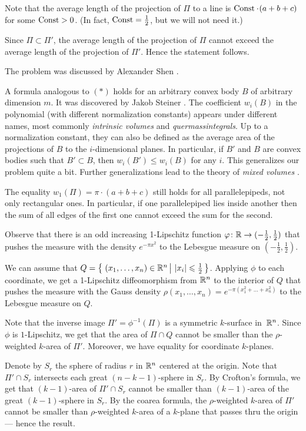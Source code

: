Note that the average length of the projection of $\Pi$ to a line is
$\Const\cdot(a+b+c)$ for some $\operatorname{\rm Const}\nolimits>0$.
(In fact, $\operatorname{\rm Const}\nolimits=\tfrac12$, but we will not need it.)

Since $\Pi\subset \Pi'$,
the average length of the projection of $\Pi$
cannot exceed the average length of the projection of $\Pi'$.
Hence the statement follows.
\qeds

The problem was discussed by Alexander Shen \cite{shen}.

A formula analogous to $({*})$
holds for an arbitrary convex body $B$ of arbitrary dimension $m$.
It was discovered by Jakob Steiner \cite{steiner}.
The coefficient $w_i(B)$ in the polynomial (with different normalization constants)
appears under different names, most commonly
\emph{intrinsic volumes} and
\emph{quermassintegrals}.
Up to a normalization constant,
they can also be defined as the average 
area of the projections of $B$ to the $i$-dimensional planes.
In particular, 
if $B'$ and $B$ are convex bodies such that $B'\subset B$,
then $w_i(B')\le w_i(B)$ for any $i$.
This generalizes our problem quite a bit.
Further generalizations lead to the theory of \emph{mixed volumes} \cite{burago-zalgaller}.

The equality $w_1(\Pi)=\pi\cdot (a+b+c)$ still holds for all parallelepipeds, not only rectangular ones.
In particular, if one parallelepiped 
lies inside another then the sum of all edges of the first one cannot exceed the sum for the second.

Observe that there is an odd increasing 1-Lipschitz function $\varphi\colon\mathbb{R}\to(-\tfrac12,\tfrac12)$ that pushes the measure with the density $e^{-\pi x^2}$ to the Lebesgue measure on $(-\tfrac12,\tfrac12)$.

We can assume that $Q=\set{(x_1,\dots,x_n)\in \RR^n}{|x_i|\le \tfrac12}$.
Applying $\phi$ to each coordinate,
we get a 1-Lipschitz diffeomorphism from $\mathbb{R}^n$ to the interior of $Q$ that pushes the measure with the Gauss density 
$\rho(x_1,\dots,x_n)=e^{-\pi (x_1^2+\dots+x_n^2)}$ to the Lebesgue measure on $Q$.

Note that the inverse image $\Pi'=\phi^{-1}(\Pi)$ is a symmetric $k$-surface in~$\mathbb{R}^n$.
Since $\phi$ is $1$-Lipschitz, we get that the area of $\Pi\cap Q$ cannot be smaller than the $\rho$-weighted $k$-area of $\Pi'$.
Moreover, we have equality for coordinate $k$-planes.

Denote by $S_r$ the sphere of radius $r$ in $\mathbb{R}^n$ centered at the origin.
Note that $\Pi'\cap S_r$ intersects each great $(n-k-1)$-sphere in $S_r$.
By Crofton's formula, we get that $(k-1)$-area of $\Pi'\cap S_r$ cannot be smaller than $(k-1)$-area of the great $(k-1)$-sphere in $S_r$.
By the coarea formula, the $\rho$-weighted $k$-area of $\Pi'$ cannot be smaller than $\rho$-weighted $k$-area of a $k$-plane that passes thru the origin --- hence the result.
\qeds

